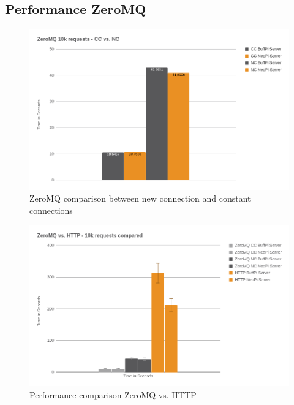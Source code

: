 \subsection{Performance ZeroMQ}
\begin{figure}[H]
    \centering
    \includegraphics[width=\textwidth]{resources/images/performance_zeromq_cc_vs_nc.png}
    \caption[ZeroMQ comparison between new connection and constant connections]{ZeroMQ comparison between new connection and constant connections}
    \label{fig:performance_zeromq_cc_vs_nc}
\end{figure}
\begin{figure}[H]
    \centering
    \includegraphics[width=\textwidth]{resources/images/performance_zeromq_vs_http.png}
    \caption[Performance comparison ZeroMQ vs. HTTP]{Performance comparison ZeroMQ vs. HTTP}
    \label{fig:performance_zeromq_vs_http}
\end{figure}

